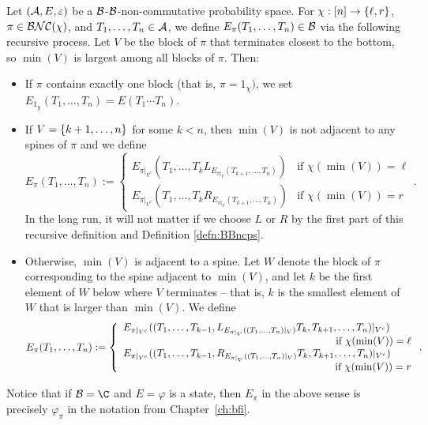 \begin{definition}
	\label{defn:recursivedefinitionofEpi}
	Let $(\mathcal{A}, E, \varepsilon)$ be a $\mathcal{B}$-$\mathcal{B}$-non-commutative probability space.
	For $\chi : [n] \to \left\{\ell, r\right\}$, $\pi \in \mathcal{BNC}(\chi)$, and $T_1, \ldots, T_n \in \mathcal{A}$, we define $E_\pi(T_1,\ldots, T_n) \in \mathcal{B}$ via the following recursive process.
	Let $V$ be the block of $\pi$ that terminates closest to the bottom, so $\min(V)$ is largest among all blocks of $\pi$. Then:
	\begin{itemize}
		\item If $\pi$ contains exactly one block (that is, $\pi = 1_\chi)$, we set $E_{1_\chi}(T_1, \ldots, T_n) = E(T_1 \cdots T_n)$.

		\item If $V = \left\{k+1, \ldots, n\right\}$ for some $k < n$, then $\min(V)$ is not adjacent to any spines of $\pi$ and we define
			\[
				E_\pi(T_1, \ldots, T_n) := \left\{
					\begin{array}{ll}
						E_{\pi|_{V^c}}(T_1, \ldots, T_k L_{E_{\pi|_V}(T_{k+1},\ldots, T_n)}) & \text{if } \chi(\min(V)) = \ell
						\\
						E_{\pi|_{V^c}}(T_1, \ldots, T_k R_{E_{\pi|_V}(T_{k+1},\ldots, T_n)}) & \text{if } \chi(\min(V)) = r
				\end{array} \right..
			\]
			In the long run, it will not matter if we choose $L$ or $R$ by the first part of this recursive definition and Definition \ref{defn:BBncps}.

		\item Otherwise, $\min(V)$ is adjacent to a spine. Let $W$ denote the block of $\pi$ corresponding to the spine adjacent to $\min(V)$, and
			let $k$ be the first element of $W$ below where $V$ terminates -- that is, $k$ is the smallest element of $W$ that is larger than $\min(V)$.
			We define
			\[
				E_\pi(T_1, \ldots, T_n) := \left\{
					\begin{array}{l}
						E_{\pi|_{V^c}}((T_1, \ldots, T_{k-1}, L_{E_{\pi|_V}((T_{1},\ldots, T_n)|_V)} T_k, T_{k+1}, \ldots, T_n)|_{V^c}) \qquad
						\\\hfill \text{if } \chi(\min(V)) = \ell \\
						E_{\pi|_{V^c}}((T_1, \ldots, T_{k-1}, R_{E_{\pi|_V}((T_{1},\ldots, T_n)|_V)} T_k, T_{k+1}, \ldots, T_n)|_{V^c}) \qquad
						\\\hfill \text{if } \chi(\min(V)) = r
				\end{array} \right..
			\]
	\end{itemize}
\end{definition}
Notice that if $\cB = \C$ and $E = \varphi$ is a state, then $E_\pi$ in the above sense is precisely $\varphi_\pi$ in the notation from Chapter~\ref{ch:bfi}.


